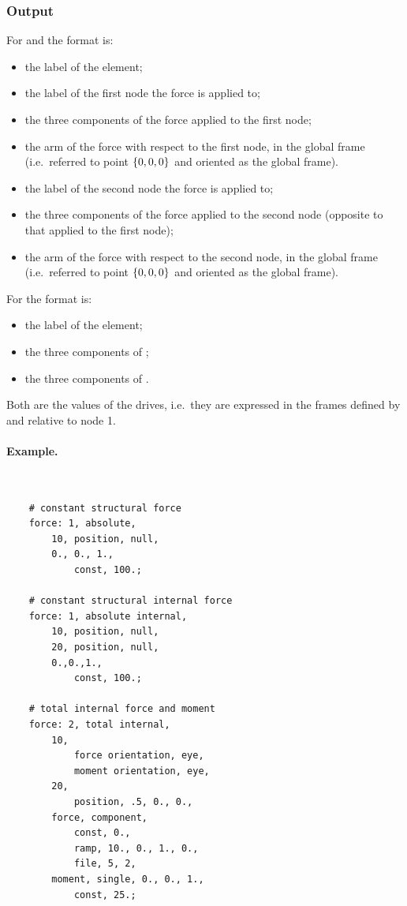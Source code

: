 \subsubsection{Output}
For  and 
the format is:
\begin{itemize}
    \item the label of the element;
    \item the label of the first node the force is applied to;
    \item the three components of the force applied to the first node;
    \item the arm of the force with respect to the first node,
	  in the global frame (i.e.\ referred to point $ \left\{ 0,0,0 \right\} $
	  and oriented as the global frame).
    \item the label of the second node the force is applied to;
    \item the three components of the force applied to the second node
	  (opposite to that applied to the first node);
    \item the arm of the force with respect to the second node,
	  in the global frame (i.e.\ referred to point $ \left\{ 0,0,0 \right\} $
	  and oriented as the global frame).
\end{itemize}
For  the format is:
\begin{itemize}
    \item the label of the element;
    \item the three components of ;
    \item the three components of .
\end{itemize}
Both are the values of the drives, i.e.\ they are expressed in
the frames defined by  and
 relative to node 1.
\paragraph{Example.} \
\begin{verbatim}
    # constant structural force
    force: 1, absolute,
        10, position, null,
        0., 0., 1.,
            const, 100.;

    # constant structural internal force
    force: 1, absolute internal,
        10, position, null,
        20, position, null,
        0.,0.,1.,
            const, 100.;

    # total internal force and moment
    force: 2, total internal,
        10,
            force orientation, eye,
            moment orientation, eye,
        20,
            position, .5, 0., 0.,
        force, component,
            const, 0.,
            ramp, 10., 0., 1., 0.,
            file, 5, 2,
        moment, single, 0., 0., 1.,
            const, 25.;
\end{verbatim}


